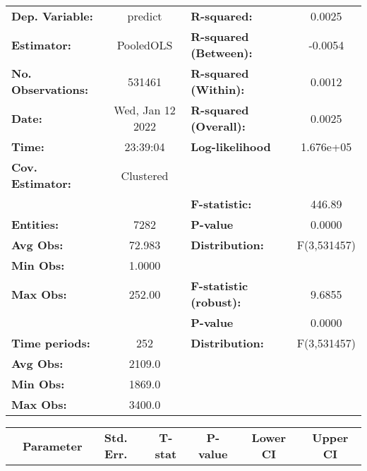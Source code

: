 \begin{center}
\begin{tabular}{lclc}
\toprule
\textbf{Dep. Variable:}    &      predict       & \textbf{  R-squared:         }   &      0.0025      \\
\textbf{Estimator:}        &     PooledOLS      & \textbf{  R-squared (Between):}  &     -0.0054      \\
\textbf{No. Observations:} &       531461       & \textbf{  R-squared (Within):}   &      0.0012      \\
\textbf{Date:}             &  Wed, Jan 12 2022  & \textbf{  R-squared (Overall):}  &      0.0025      \\
\textbf{Time:}             &      23:39:04      & \textbf{  Log-likelihood     }   &    1.676e+05     \\
\textbf{Cov. Estimator:}   &     Clustered      & \textbf{                     }   &                  \\
\textbf{}                  &                    & \textbf{  F-statistic:       }   &      446.89      \\
\textbf{Entities:}         &        7282        & \textbf{  P-value            }   &      0.0000      \\
\textbf{Avg Obs:}          &       72.983       & \textbf{  Distribution:      }   &   F(3,531457)    \\
\textbf{Min Obs:}          &       1.0000       & \textbf{                     }   &                  \\
\textbf{Max Obs:}          &       252.00       & \textbf{  F-statistic (robust):} &      9.6855      \\
\textbf{}                  &                    & \textbf{  P-value            }   &      0.0000      \\
\textbf{Time periods:}     &        252         & \textbf{  Distribution:      }   &   F(3,531457)    \\
\textbf{Avg Obs:}          &       2109.0       & \textbf{                     }   &                  \\
\textbf{Min Obs:}          &       1869.0       & \textbf{                     }   &                  \\
\textbf{Max Obs:}          &       3400.0       & \textbf{                     }   &                  \\
\bottomrule
\end{tabular}
\begin{tabular}{lcccccc}
                & \textbf{Parameter} & \textbf{Std. Err.} & \textbf{T-stat} & \textbf{P-value} & \textbf{Lower CI} & \textbf{Upper CI}  \\

\end{tabular}
\end{center}
